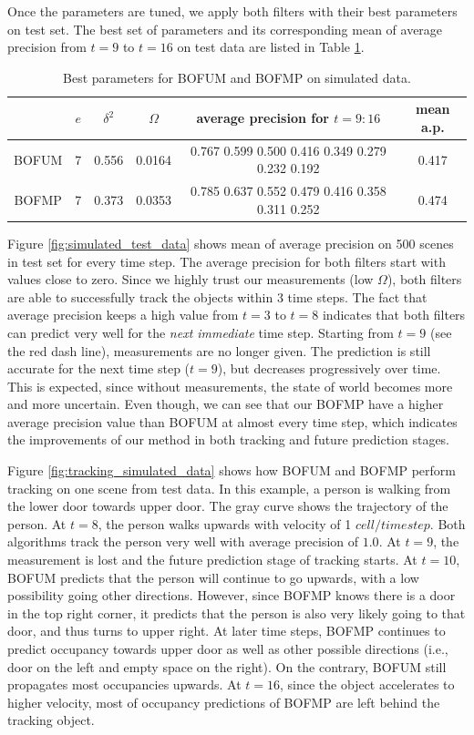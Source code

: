  Once the parameters are tuned, we apply both filters with their best parameters on test set. The best set of parameters and its corresponding mean of average precision from \( t=9 \) to \( t=16 \) on test data are listed in Table \ref{table:best_param_simulated}. 

\begin{table}[H]
\centering  
\begin{tabularx}{\textwidth}{c|c|c|c|c|c}
    \hline
    & $ e $ & $ \delta^2 $ & $ \Omega $ & average precision for $t=9:16 $ & \footnotesize{mean a.p.}\\ \hline
    BOFUM & 7 & 0.556 & 0.0164 &  0.767  0.599  0.500    0.416  0.349  0.279  0.232  0.192 & 0.417 \\
    BOFMP & 7 & 0.373 & 0.0353 & 0.785  0.637  0.552  0.479  0.416  0.358  0.311  0.252 & 0.474 \\
   \hline
  \end{tabularx}
\caption{Best parameters for BOFUM and BOFMP on simulated data.}
\label{table:best_param_simulated}
\end{table}

Figure \ref{fig:simulated_test_data} shows mean of average precision on 500 scenes in test set for every time step. The average precision for both filters start with values close to zero. Since we highly trust our measurements (low $\Omega$), both filters are able to successfully track the objects within 3 time steps. The fact that average precision keeps a high value from $t=3$ to $t=8$ indicates that both filters can predict very well for the \textit{next immediate} time step. Starting from $t=9$ (see the red dash line), measurements are no longer given. The prediction is still accurate for the next time step ($t=9$), but decreases progressively over time.  This is expected, since without measurements, the state of world becomes more and more uncertain. Even though, we can see that our BOFMP have a higher average precision value than BOFUM at almost every time step, which indicates the improvements of our method in both tracking and future prediction stages.

Figure \ref{fig:tracking_simulated_data} shows how BOFUM and BOFMP perform tracking on one scene from test data. In this example, a person is walking from the lower door towards upper door. The gray curve shows the trajectory of the person. At $t=8$, the person walks upwards with velocity of 1 $cell/timestep$. Both algorithms track the person very well with average precision of $1.0$. At $t=9$, the measurement is lost and the future prediction stage of tracking starts. At $t=10$, BOFUM predicts that the person will continue to go upwards, with a low possibility going other directions. However, since BOFMP knows there is a door in the top right corner, it predicts that the person is also very likely going to that door, and thus turns to upper right. At later time steps, BOFMP continues to predict occupancy towards upper door as well as other possible directions (i.e., door on the left and empty space on the right). On the contrary, BOFUM still propagates most occupancies upwards. At $t=16$, since the object accelerates to higher velocity, most of occupancy predictions of BOFMP are left behind the tracking object.

